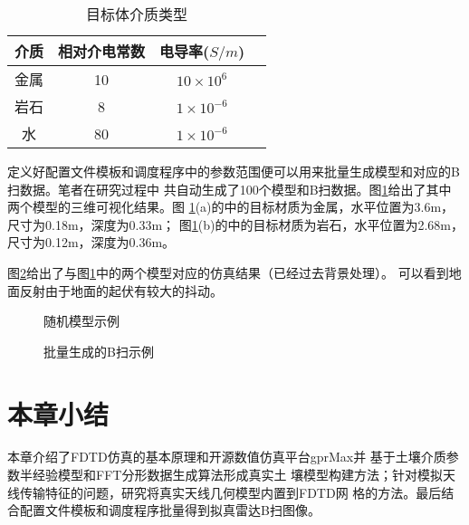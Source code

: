 \begin{table}[htbp]
	\caption{目标体介质类型} 
	\begin{tabular}{|c|c|c|c|} 
		\hline  
		介质 &  相对介电常数 & 电导率($S/m$)\\
		\hline 
		金属 & 10 & $10\times10^6$ \\  
		\hline  
		岩石 & 8 & $1\times10^{-6}$ \\  
		\hline  
		水 & 80 & $1\times10^{-6}$ \\  
		\hline  
	\end{tabular}
	\label{table_material}
\end{table}

定义好配置文件模板和调度程序中的参数范围便可以用来批量生成模型和对应的B扫数据。笔者在研究过程中
共自动生成了100个模型和B扫数据。图\ref{model_example}给出了其中两个模型的三维可视化结果。图
\ref{model_example}(a)的中的目标材质为金属，水平位置为3.6m，尺寸为0.18m，深度为0.33m；
图\ref{model_example}(b)的中的目标材质为岩石，水平位置为2.68m，尺寸为0.12m，深度为0.36m。

图\ref{bscan_example}给出了与图\ref{model_example}中的两个模型对应的仿真结果（已经过去背景处理）。
可以看到地面反射由于地面的起伏有较大的抖动。
\begin{figure}[H]
	\caption{随机模型示例}
	\label{model_example}
\end{figure}

\begin{figure}[H]
	\caption{批量生成的B扫示例}
	\label{bscan_example}
\end{figure}
\section{本章小结}
本章介绍了FDTD仿真的基本原理和开源数值仿真平台gprMax并
基于土壤介质参数半经验模型和FFT分形数据生成算法形成真实土
壤模型构建方法；针对模拟天线传输特征的问题，研究将真实天线几何模型内置到FDTD网
格的方法。最后结合配置文件模板和调度程序批量得到拟真雷达B扫图像。